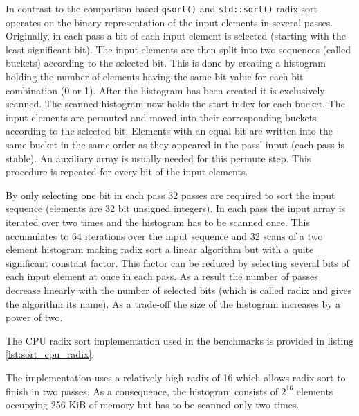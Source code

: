 In contrast to the comparison based \lstinline!qsort()! and \lstinline!std::sort()! radix sort operates on the binary representation of the input elements in several passes. Originally, in each pass a bit of each input element is selected (starting with the least significant bit). The input elements are then split into two sequences (called buckets) according to the selected bit. This is done by creating a histogram holding the number of elements having the same bit value for each bit combination (0 or 1). After the histogram has been created it is exclusively scanned. The scanned histogram now holds the start index for each bucket. The input elements are permuted and moved into their corresponding buckets according to the selected bit. Elements with an equal bit are written into the same bucket in the same order as they appeared in the pass' input (each pass is stable). An auxiliary array is usually needed for this permute step. This procedure is repeated for every bit of the input elements. 

By only selecting one bit in each pass 32 passes are required to sort the input sequence (elements are 32 bit unsigned integers). In each pass the input array is iterated over two times and the histogram has to be scanned once. This accumulates to 64 iterations over the input sequence and 32 scans of a two element histogram making radix sort a linear algorithm but with a quite significant constant factor. This factor can be reduced by selecting several bits of each input element at once in each pass. As a result the number of passes decrease linearly with the number of selected bits (which is called radix and gives the algorithm its name). As a trade-off the size of the histogram increases by a power of two.

The CPU radix sort implementation used in the benchmarks is provided in listing \ref{lst:sort_cpu_radix}.



The implementation uses a relatively high radix of 16 which allows radix sort to finish in two passes. As a consequence, the histogram consists of $2^{16}$ elements occupying 256 KiB of memory but has to be scanned only two times.


